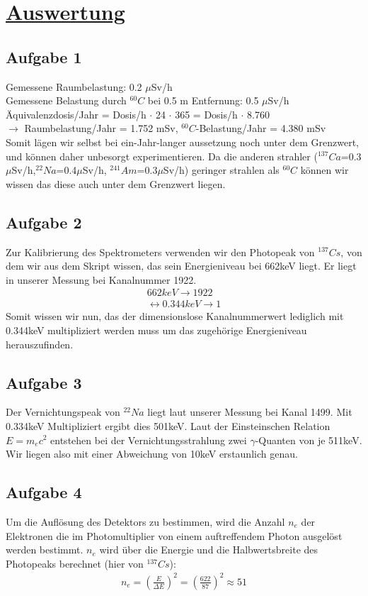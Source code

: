 \documentclass[11pt,a4paper]{article}
\begin{document}
\section{\underline{Auswertung}}
  \subsection{Aufgabe 1}
   Gemessene Raumbelastung: 0.2 $\mu$Sv/h \\
   Gemessene Belastung durch $^{60}{C}$ bei 0.5 m Entfernung: 0.5 $\mu$Sv/h \\
   \"Aquivalenzdosis/Jahr = Dosis/h $\cdot$ 24 $\cdot$ 365 = Dosis/h $\cdot$ 8.760 \\
   $\rightarrow$ Raumbelastung/Jahr = 1.752 mSv, $^{60}{C}$-Belastung/Jahr = 4.380 mSv \\
   Somit l\"agen wir selbst bei ein-Jahr-langer aussetzung noch unter dem Grenzwert,
   und k\"onnen daher unbesorgt experimentieren. Da die anderen strahler
   ($^{137}{Ca}$=0.3$\mu$Sv/h,$^{22}{Na}$=0.4$\mu$Sv/h, $^{241}{Am}$=0.3$\mu$Sv/h) geringer strahlen als
   $^{60}{C}$ k\"onnen wir wissen das diese auch unter dem Grenzwert liegen.
  \subsection{Aufgabe 2}
   Zur Kalibrierung des Spektrometers verwenden wir den Photopeak von $^{137}{Cs}$, von dem wir aus dem Skript wissen,
   das sein Energieniveau bei 662keV liegt. Er liegt in unserer Messung bei Kanalnummer 1922. 
    \begin{align}
     662keV \rightarrow 1922 \\
     \leftrightarrow 0.344keV \rightarrow 1
    \end{align}
   Somit wissen wir nun, das der dimensionslose Kanalnummerwert lediglich mit 0.344keV multipliziert werden muss um das zugeh\"orige Energieniveau
   herauszufinden.
  \subsection{Aufgabe 3}
   Der Vernichtungspeak von $^{22}{Na}$ liegt laut unserer Messung bei Kanal 1499. Mit 0.334keV Multipliziert ergibt dies 501keV. Laut der Einsteinschen Relation
   $E={m}_{e}c^2$ entstehen bei der Vernichtungsstrahlung zwei $\gamma$-Quanten von je 511keV. Wir liegen also mit einer Abweichung von 10keV erstaunlich genau.
  \subsection{Aufgabe 4}
   Um die Aufl\"osung des Detektors zu bestimmen, wird die Anzahl ${n}_{e}$ der Elektronen die im
   Photomultiplier von einem auftreffendem Photon ausgel\"ost werden bestimmt. ${n}_{e}$ wird \"uber die 
   Energie und die Halbwertsbreite des Photopeaks berechnet (hier von $^{137}{Cs}$):
    \begin{align}
     {n}_{e} = {\left(\frac{E}{{\Delta}E}\right)}^{2} = {\left(\frac{622}{87}\right)}^{2} \approx
     51
    \end{align}
\end{document}
